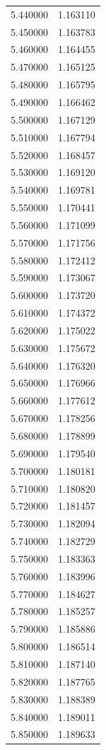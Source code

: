 \begin{tabular}{rr}
5.440000 & 1.163110 \\
5.450000 & 1.163783 \\
5.460000 & 1.164455 \\
5.470000 & 1.165125 \\
5.480000 & 1.165795 \\
5.490000 & 1.166462 \\
5.500000 & 1.167129 \\
5.510000 & 1.167794 \\
5.520000 & 1.168457 \\
5.530000 & 1.169120 \\
5.540000 & 1.169781 \\
5.550000 & 1.170441 \\
5.560000 & 1.171099 \\
5.570000 & 1.171756 \\
5.580000 & 1.172412 \\
5.590000 & 1.173067 \\
5.600000 & 1.173720 \\
5.610000 & 1.174372 \\
5.620000 & 1.175022 \\
5.630000 & 1.175672 \\
5.640000 & 1.176320 \\
5.650000 & 1.176966 \\
5.660000 & 1.177612 \\
5.670000 & 1.178256 \\
5.680000 & 1.178899 \\
5.690000 & 1.179540 \\
5.700000 & 1.180181 \\
5.710000 & 1.180820 \\
5.720000 & 1.181457 \\
5.730000 & 1.182094 \\
5.740000 & 1.182729 \\
5.750000 & 1.183363 \\
5.760000 & 1.183996 \\
5.770000 & 1.184627 \\
5.780000 & 1.185257 \\
5.790000 & 1.185886 \\
5.800000 & 1.186514 \\
5.810000 & 1.187140 \\
5.820000 & 1.187765 \\
5.830000 & 1.188389 \\
5.840000 & 1.189011 \\
5.850000 & 1.189633 \\

\end{tabular}
